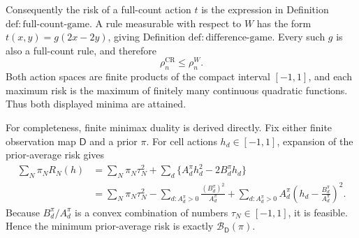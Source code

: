 Consequently the risk of a full-count action \(t\) is the expression in Definition \(\mathrm{def{:}full\mbox{-}count\mbox{-}game}\).  A rule measurable with respect to \(W\) has the form \(t(x,y)=g(2x-2y)\), giving Definition \(\mathrm{def{:}difference\mbox{-}game}\).  Every such \(g\) is also a full-count rule, and therefore
\[
 \rho_n^{\mathrm{CR}}\leq \rho_n^W.
\]
Both action spaces are finite products of the compact interval \([-1,1]\), and each maximum risk is the maximum of finitely many continuous quadratic functions.  Thus both displayed minima are attained.

For completeness, finite minimax duality is derived directly.  Fix either finite observation map \(\mathsf D\) and a prior \(\pi\).  For cell actions \(h_d\in[-1,1]\), expansion of the prior-average risk gives
\[
 \begin{aligned}
 \sum_N\pi_NR_N(h)
 &=\sum_N\pi_N\tau_N^2+
   \sum_d\{A_d^\pi h_d^2-2B_d^\pi h_d\}\\
 &=\sum_N\pi_N\tau_N^2-
   \sum_{d:A_d^\pi>0}\frac{(B_d^\pi)^2}{A_d^\pi}
   +\sum_{d:A_d^\pi>0}A_d^\pi
      \left(h_d-\frac{B_d^\pi}{A_d^\pi}\right)^2.
 \end{aligned}
\]
Because \(B_d^\pi/A_d^\pi\) is a convex combination of numbers \(\tau_N\in[-1,1]\), it is feasible.  Hence the minimum prior-average risk is exactly \(\mathcal B_{\mathsf D}(\pi)\).

